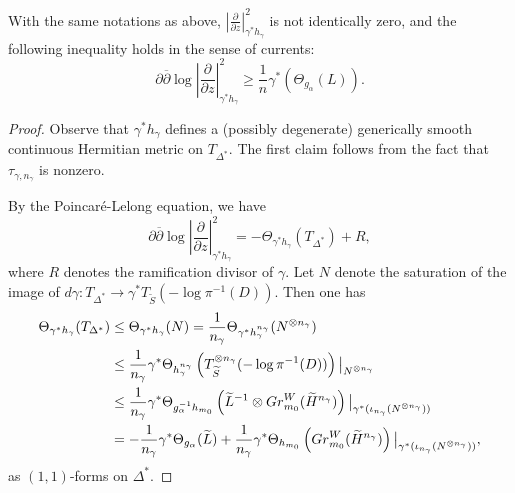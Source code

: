 \documentclass[10pt,a4paper]{amsart}
\begin{document}
	\begin{prop}\label{prop_negative_curvature}  
		With the same notations as above, $|\frac{\partial}{\partial z}|^2_{\gamma^\ast h_\gamma}$ is not identically zero, and the following inequality holds in the sense of currents:  
		$$  
		\partial\overline{\partial} \log \left| \frac{\partial}{\partial z} \right|^2_{\gamma^\ast h_\gamma} \geq \frac{1}{n} \gamma^\ast (\Theta_{g_\alpha}(L)).  
		$$  
	\end{prop}  	

	\begin{proof}  
		Observe that $\gamma^\ast h_\gamma$ defines a (possibly degenerate) generically smooth continuous Hermitian metric on $T_{\Delta^\ast}$. The first claim follows from the fact that $\tau_{\gamma,n_\gamma}$ is nonzero.  
		
		By the Poincar\'e-Lelong equation, we have  
		$$  
		\partial\overline{\partial} \log \left| \frac{\partial}{\partial z} \right|^2_{\gamma^\ast h_\gamma} = -\Theta_{\gamma^\ast h_\gamma}(T_{\Delta^\ast}) + R,  
		$$  
		where $R$ denotes the ramification divisor of $\gamma$. Let $N$ denote the saturation of the image of $d\gamma: T_{\Delta^\ast} \to \gamma^\ast T_{\widetilde{S}}(-\log \pi^{-1}(D))$. Then one has  
		\begin{align*}  
			\Theta_{\gamma^\ast h_\gamma}(T_{\Delta^\ast}) &\leq \Theta_{\gamma^\ast h_\gamma}(N) = \frac{1}{n_\gamma} \Theta_{\gamma^\ast h_\gamma^{n_\gamma}}(N^{\otimes n_\gamma}) \\  
			&\leq \frac{1}{n_\gamma} \gamma^\ast \Theta_{h_\gamma^{n_\gamma}}\left(T^{\otimes n_\gamma}_{\widetilde{S}}(-\log \pi^{-1}(D))\right)\big|_{N^{\otimes n_\gamma}} \\  
			&\leq \frac{1}{n_\gamma} \gamma^\ast \Theta_{g_\alpha^{-1}h_{m_0}}\left(\widetilde{L}^{-1} \otimes {\rm Gr}^W_{m_0}(\widetilde{H}^{n_\gamma})\right)\big|_{\gamma^\ast(\iota_{n_\gamma}(N^{\otimes n_\gamma}))} \\  
			&= -\frac{1}{n_\gamma} \gamma^\ast \Theta_{g_\alpha}(\widetilde{L}) + \frac{1}{n_\gamma} \gamma^\ast \Theta_{h_{m_0}}\left({\rm Gr}^W_{m_0}(\widetilde{H}^{n_\gamma})\right)\big|_{\gamma^\ast(\iota_{n_\gamma}(N^{\otimes n_\gamma}))},  
		\end{align*}  
		as $(1,1)$-forms on $\Delta^\ast$.  
		

\end{proof}
\end{document}
